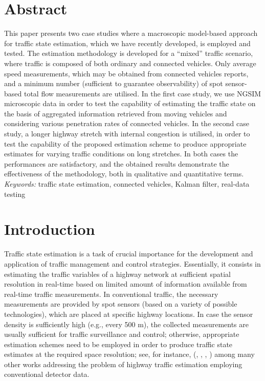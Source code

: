 \documentclass[titlepage,oneside,fleqn,12pt]{article}
\newcommand{\trbnum}[1]{{\it \citenum{#1}}}
\begin{document}
\section{Abstract}
This paper presents two case studies where a macroscopic model-based approach for traffic state estimation, which we have recently developed, is employed and tested. The estimation methodology is developed for a ``mixed'' traffic scenario, where traffic is composed of both ordinary and connected vehicles. Only average speed measurements, which may be obtained from connected vehicles reports, and a minimum number (sufficient to guarantee observability) of spot sensor-based total flow measurements are utilised.
In the first case study, we use NGSIM microscopic data in order to test the capability of estimating the traffic state on the basis of aggregated information retrieved from moving vehicles and considering various penetration rates of connected vehicles. In the second case study, a longer highway stretch with internal congestion is utilised, in order to test the capability of the proposed estimation scheme to produce appropriate estimates for varying traffic conditions on long stretches. In both cases the performances are satisfactory, and the obtained results demonstrate the effectiveness of the methodology, both in qualitative and quantitative terms.
\\[2.5cm]
\textit{Keywords:} traffic state estimation, connected vehicles, Kalman filter, real-data testing
\newpage

\section{Introduction} \label{sec:intro}

Traffic state estimation is a task of crucial importance for the development and application of traffic management and control strategies. Essentially, it consists in estimating the traffic variables of a highway network at sufficient spatial resolution in real-time based on limited amount of information available from real-time traffic measurements. In conventional traffic, the necessary measurements are provided by spot sensors (based on a variety of possible technologies), which are placed at specific highway locations. In case the sensor density is sufficiently high (e.g., every 500 m), the collected measurements are usually sufficient for traffic surveillance and control; otherwise, appropriate estimation schemes need to be employed in order to produce traffic state estimates at the required space resolution; see, for instance, (\trbnum{Munoz2003}, \trbnum{Wang2005}, \trbnum{Mihaylova2007}, \trbnum{Morbidi2014}) among many other works addressing the problem of highway traffic estimation employing conventional detector data.
\end{document}
